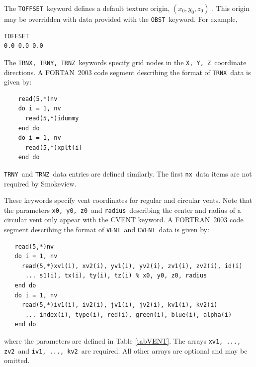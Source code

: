 \documentclass[11pt,twoside]{book}
\begin{document}
The {\tt TOFFSET}\ keyword defines a default texture origin, $(x_0, y_0, z_0)$ .
This origin may be overridden with data provided with the {\tt OBST}\ keyword. For example,

\begin{lstlisting}
TOFFSET
0.0 0.0 0.0
\end{lstlisting}

The {\tt TRNX, TRNY, TRNZ}\ keywords specify
grid nodes in the {\tt X, Y, Z}\ coordinate directions.  A
FORTAN~2003 code segment describing the format of {\tt TRNX}\ data
is given by:
\begin{lstlisting}
    read(5,*)nv
    do i = 1, nv
      read(5,*)idummy
    end do
    do i = 1, nv
      read(5,*)xplt(i)
    end do
\end{lstlisting}
{\tt TRNY}\ and {\tt TRNZ}\ data entries are defined similarly. The
first {\tt nx}\ data items are not required by Smokeview.

These keywords specify vent coordinates for regular and circular vents.
Note that the parameters {\tt x0, y0, z0}\ and {\tt radius}\ describing the center and radius
of a circular vent
only appear with the CVENT keyword.
A FORTRAN~2003
code segment describing the format of {\tt VENT}\ and {\tt CVENT}\ data is given by:
\begin{lstlisting}
   read(5,*)nv
   do i = 1, nv
     read(5,*)xv1(i), xv2(i), yv1(i), yv2(i), zv1(i), zv2(i), id(i)
      ... s1(i), tx(i), ty(i), tz(i) % x0, y0, z0, radius
   end do
   do i = 1, nv
     read(5,*)iv1(i), iv2(i), jv1(i), jv2(i), kv1(i), kv2(i)
      ... index(i), type(i), red(i), green(i), blue(i), alpha(i)
   end do
\end{lstlisting}
where the parameters are defined in Table \ref{tabVENT}.
The arrays {\tt xv1,  ..., zv2}\ and {\tt iv1, ..., kv2}\ are
required. All other arrays are optional and may be omitted.
\end{document}
